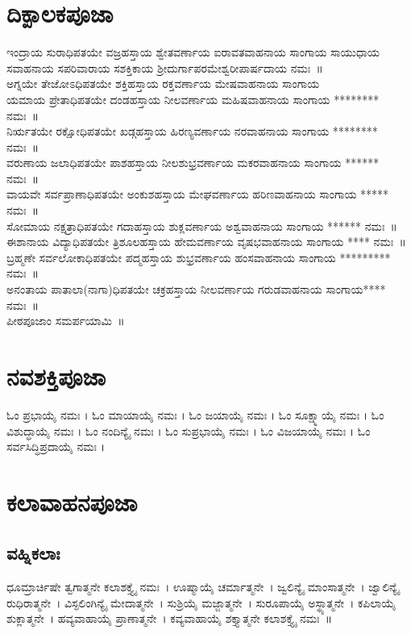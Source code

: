 \section{ದಿಕ್ಪಾಲಕಪೂಜಾ}
 ಇಂದ್ರಾಯ ಸುರಾಧಿಪತಯೇ ವಜ್ರಹಸ್ತಾಯ ಶ್ವೇತವರ್ಣಾಯ ಐರಾವತವಾಹನಾಯ ಸಾಂಗಾಯ ಸಾಯುಧಾಯ ಸವಾಹನಾಯ ಸಪರಿವಾರಾಯ ಸಶಕ್ತಿಕಾಯ  ಶ್ರೀದುರ್ಗಾಪರಮೇಶ್ವರೀಪಾರ್ಷದಾಯ ನಮಃ~॥\\
 ಅಗ್ನಯೇ ತೇಜೋಽಧಿಪತಯೇ ಶಕ್ತಿಹಸ್ತಾಯ ರಕ್ತವರ್ಣಾಯ ಮೇಷವಾಹನಾಯ ಸಾಂಗಾಯ\\
 ಯಮಾಯ ಪ್ರೇತಾಧಿಪತಯೇ ದಂಡಹಸ್ತಾಯ ನೀಲವರ್ಣಾಯ ಮಹಿಷವಾಹನಾಯ ಸಾಂಗಾಯ ******** ನಮಃ~॥\\
 ನಿರ್ಋತಯೇ ರಕ್ಷೋಧಿಪತಯೇ ಖಡ್ಗಹಸ್ತಾಯ ಹಿರಣ್ಯವರ್ಣಾಯ ನರವಾಹನಾಯ ಸಾಂಗಾಯ ******** ನಮಃ~॥\\
 ವರುಣಾಯ ಜಲಾಧಿಪತಯೇ ಪಾಶಹಸ್ತಾಯ ನೀಲಶುಭ್ರವರ್ಣಾಯ ಮಕರವಾಹನಾಯ ಸಾಂಗಾಯ ****** ನಮಃ~॥\\
 ವಾಯವೇ ಸರ್ವಪ್ರಾಣಾಧಿಪತಯೇ ಅಂಕುಶಹಸ್ತಾಯ ಮೇಘವರ್ಣಾಯ ಹರಿಣವಾಹನಾಯ ಸಾಂಗಾಯ  ***** ನಮಃ~॥\\
 ಸೋಮಾಯ ನಕ್ಷತ್ರಾಧಿಪತಯೇ ಗದಾಹಸ್ತಾಯ ಶುಕ್ಲವರ್ಣಾಯ ಅಶ್ವವಾಹನಾಯ ಸಾಂಗಾಯ ****** ನಮಃ~॥\\
 ಈಶಾನಾಯ ವಿದ್ಯಾಧಿಪತಯೇ ತ್ರಿಶೂಲಹಸ್ತಾಯ ಹೇಮವರ್ಣಾಯ ವೃಷಭವಾಹನಾಯ ಸಾಂಗಾಯ **** ನಮಃ~॥\\
 ಬ್ರಹ್ಮಣೇ ಸರ್ವಲೋಕಾಧಿಪತಯೇ ಪದ್ಮಹಸ್ತಾಯ ಶುಭ್ರವರ್ಣಾಯ ಹಂಸವಾಹನಾಯ  ಸಾಂಗಾಯ ********* ನಮಃ~॥\\
  ಅನಂತಾಯ ಪಾತಾಲಾ(ನಾಗಾ)ಧಿಪತಯೇ ಚಕ್ರಹಸ್ತಾಯ ನೀಲವರ್ಣಾಯ ಗರುಡವಾಹನಾಯ  ಸಾಂಗಾಯ**** ನಮಃ~॥\\
ಪೀಠಪೂಜಾಂ ಸಮರ್ಪಯಾಮಿ~॥
\section{ನವಶಕ್ತಿಪೂಜಾ}
ಓಂ ಪ್ರಭಾಯೈ ನಮಃ । ಓಂ  ಮಾಯಾಯೈ ನಮಃ । ಓಂ  ಜಯಾಯೈ ನಮಃ । ಓಂ  ಸೂಕ್ಷ್ಮಾಯೈ ನಮಃ । ಓಂ  ವಿಶುದ್ಧಾಯೈ ನಮಃ । ಓಂ  ನಂದಿನ್ಯೈ ನಮಃ । ಓಂ  ಸುಪ್ರಭಾಯೈ ನಮಃ । ಓಂ  ವಿಜಯಾಯೈ ನಮಃ । ಓಂ  ಸರ್ವಸಿದ್ಧಿಪ್ರದಾಯೈ ನಮಃ ।
\section{ಕಲಾವಾಹನಪೂಜಾ}
\subsection{ವಹ್ನಿಕಲಾಃ}
 ಧೂಮ್ರಾರ್ಚಿಷೇ ತ್ವಗಾತ್ಮನೇ ಕಲಾಶಕ್ತ್ಯೈ ನಮಃ~।  ಊಷ್ಮಾಯೈ ಚರ್ಮಾತ್ಮನೇ~।  ಜ್ವಲಿನ್ಯೈ ಮಾಂಸಾತ್ಮನೇ~।  ಜ್ವಾಲಿನ್ಯೈ ರುಧಿರಾತ್ಮನೇ~।  ವಿಸ್ಫಲಿಂಗಿನ್ಯೈ ಮೇದಾತ್ಮನೇ~।  ಸುಶ್ರಿಯೈ ಮಜ್ಜಾತ್ಮನೇ~।  ಸುರೂಪಾಯೈ ಅಸ್ಥ್ಯಾತ್ಮನೇ~।  ಕಪಿಲಾಯೈ ಶುಕ್ಲಾತ್ಮನೇ~।  ಹವ್ಯವಾಹಾಯೈ ಪ್ರಾಣಾತ್ಮನೇ~।  ಕವ್ಯವಾಹಾಯೈ ಶಕ್ತ್ಯಾತ್ಮನೇ ಕಲಾಶಕ್ತ್ಯೈ ನಮಃ~॥\\

